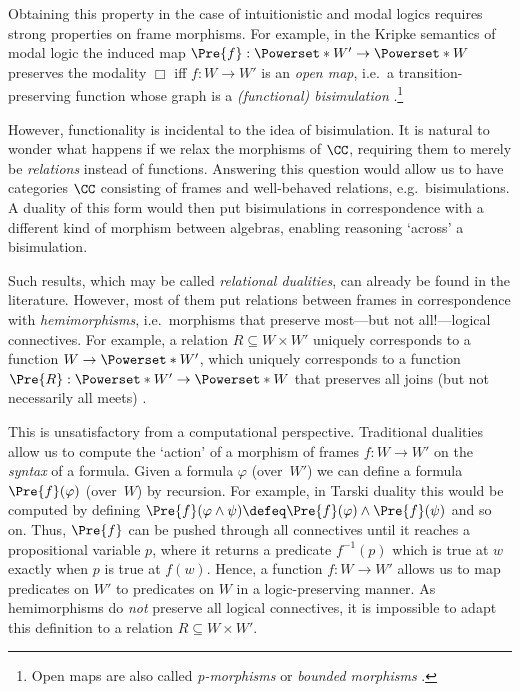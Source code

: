 Obtaining this property in the case of intuitionistic and modal logics requires
strong properties on frame morphisms. For example, in the Kripke semantics of
modal logic the induced map $\Pre{f} : \Powerset*{W'} \to \Powerset*{W}$
preserves the modality $\Box$ iff $f : W \to W'$ is an \emph{open map}, i.e.\ a
transition-preserving function whose graph is a \emph{(functional) bisimulation}
\cite[\S 2.4]{kishida_2018}.\footnote{Open maps are also called
  \emph{p-morphisms} \cite[\S 2.3]{chagrov_1996} or \emph{bounded morphisms}
\cite[\S 2.1]{blackburn_2001}.}

However, functionality is incidental to the idea of bisimulation. It is natural
to wonder what happens if we relax the morphisms of $\CC$, requiring them to
merely be \emph{relations} instead of functions. Answering this question would
allow us to have categories $\CC$ consisting of frames and well-behaved
relations, e.g.\ bisimulations. A duality of this form would then put
bisimulations in correspondence with a different kind of morphism between
algebras, enabling reasoning `across' a bisimulation.

Such results, which may be called \emph{relational dualities}, can already be found
in the literature. However, most of them put relations between frames in
correspondence with \emph{hemimorphisms}, i.e.\ morphisms that preserve
most---but not all!---logical connectives. For example, a relation $R \subseteq
W \times W'$ uniquely corresponds to a function $W \to \Powerset*{W'}$, which uniquely
corresponds to a function $\Pre{R} : \Powerset*{W'} \to \Powerset*{W}$ that
preserves all joins (but not necessarily all meets) \cite{jonsson_1951} \cite[\S
2.3]{kishida_2018}. 

This is unsatisfactory from a computational perspective. Traditional dualities
allow us to compute the `action' of a morphism of frames $f : W \to W'$ on the
\emph{syntax} of a formula. Given a formula $\varphi$ (over~$W'$) we can define
a formula $\Pre{f}(\varphi)$ (over~$W$) by recursion. For example, in Tarski
duality this would be computed by defining $\Pre{f}(\varphi \land \psi) \defeq
\Pre{f}(\varphi) \land \Pre{f}(\psi)$ and so on. Thus, $\Pre{f}$ can be pushed
through all connectives until it reaches a propositional variable $p$, where it
returns a predicate $f^{-1}(p)$ which is true at $w$ exactly when $p$ is true at
$f(w)$. Hence, a function $f : W \to W'$ allows us to map predicates on $W'$ to
predicates on $W$ in a logic-preserving manner. As hemimorphisms do \emph{not}
preserve all logical connectives, it is impossible to adapt this definition to a
relation $R \subseteq W \times W'$.

